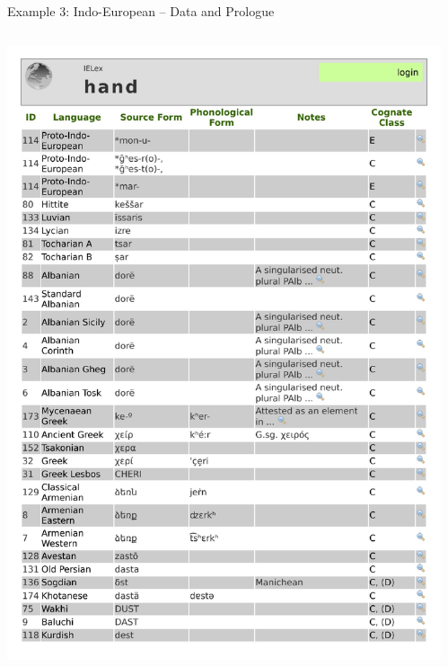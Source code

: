 \documentclass[9pt]{beamer}
\begin{document}
\begin{frame}{Example 3: Indo-European – Data and Prologue}
  \begin{columns}
    \begin{column}{0.5\textwidth}
      \footnotemark\includegraphics[width=\textwidth,page=1,trim={0.5cm 4.5cm 0.5cm 0.5cm},clip]{ielex.pdf}
    \end{column}
    \begin{column}{0.5\textwidth}

\end{column}
\end{columns}
\end{frame}
\end{document}
